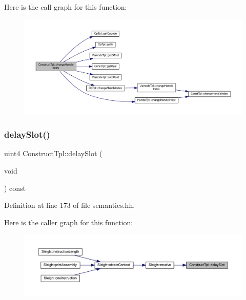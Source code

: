 Here is the call graph for this function\+:
\nopagebreak
\begin{figure}[H]
\begin{center}
\leavevmode
\includegraphics[width=350pt]{class_construct_tpl_a6748ce8632e758aabf9b0d5a252fad5f_cgraph}
\end{center}
\end{figure}
\mbox{\label{class_construct_tpl_abf2e39342736d2c1d79c8f4bee68dc3a}} 
\subsubsection{\texorpdfstring{delaySlot()}{delaySlot()}}
{\footnotesize\ttfamily uint4 Construct\+Tpl\+::delay\+Slot (\begin{DoxyParamCaption}\item[{void}]{ }\end{DoxyParamCaption}) const\hspace{0.3cm}{\ttfamily [inline]}}



Definition at line 173 of file semantics.\+hh.

Here is the caller graph for this function\+:
\nopagebreak
\begin{figure}[H]
\begin{center}
\leavevmode
\includegraphics[width=350pt]{class_construct_tpl_abf2e39342736d2c1d79c8f4bee68dc3a_icgraph}
\end{center}
\end{figure}
\mbox{\label{class_construct_tpl_aa14ea1a30814a8f8a2ae074b46562734}} 
